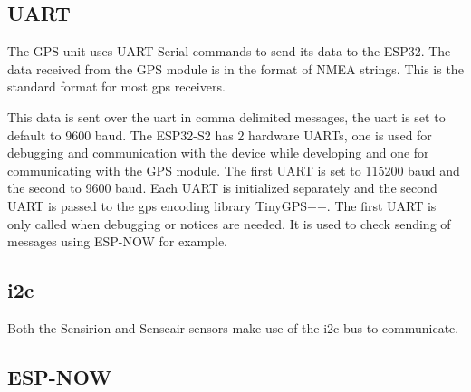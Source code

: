 \subsection{UART}
The GPS unit uses UART Serial commands to send its data to the ESP32. The data received from the GPS module is in the format of NMEA strings. This is the standard format for most gps receivers.\cite{NMEA}
\begin{table}[!htb]
	\label{tab:nmea}
	\caption{NMEA Sentences and their meanings \cite{GPSSentence}}
\end{table}

\noindent
This data is sent over the uart in comma delimited messages, the uart is set to default to 9600 baud.
The ESP32-S2 has 2 hardware UARTs, one is used for debugging and communication with the device while developing and one for communicating with the GPS module. The first UART is set to 115200 baud and the second to 9600 baud. Each UART is initialized separately and the second UART is passed to the gps encoding library TinyGPS++. The first UART is only called when debugging or notices are needed. It is used to check sending of messages using ESP-NOW for example.


\subsection{i2c}
Both the Sensirion and Senseair sensors make use of the i2c bus to communicate. 

\subsection{ESP-NOW}



